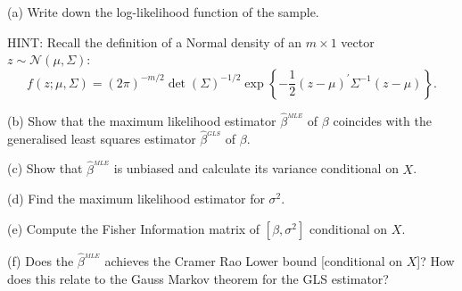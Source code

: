 \documentclass{article}
\begin{document}
(a) Write down the log-likelihood function of the sample.

HINT: Recall the definition of a Normal density of an $m\times 1$ vector $%
z\sim \mathcal{N}\left( \mu ,\Sigma \right) $: $\ $%
\begin{equation*}
f\left( z;\mu ,\Sigma \right) =\left( 2\pi \right) ^{-m/2}\det \left( \Sigma
\right) ^{-1/2}\exp \left\{ -\frac{1}{2}\left( z-\mu \right) ^{\prime
}\Sigma ^{-1}\left( z-\mu \right) \right\} .
\end{equation*}

(b) Show that the maximum likelihood estimator $\hat{\beta}^{_{MLE}}$ of $%
\beta $ coincides with the generalised least squares estimator $\hat{\beta}%
^{_{GLS}}$ of $\beta $.

(c) Show that $\hat{\beta}^{_{MLE}}$ is unbiased and calculate its variance
conditional on $X$.

(d) Find the maximum likelihood estimator for $\sigma ^{2}$.

(e) Compute the Fisher Information matrix of $[\beta ,\sigma ^{2}]$
conditional on $X$.

(f) Does the $\hat{\beta}^{_{MLE}}$ achieves the Cramer Rao Lower bound
[conditional on $X$]? How does this relate to the Gauss Markov theorem for
the GLS estimator?
\end{document}
